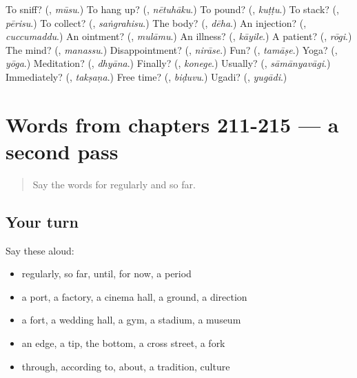 \begin{tcolorbox}[breakable,colback=teal!4,colframe=teal!35!black,title={Before you move on}]
To sniff? (\textbf{}, \emph{mūsu}.) To hang up? (\textbf{}, \emph{nētuhāku}.) To pound? (\textbf{}, \emph{kuṭṭu}.) To stack? (\textbf{}, \emph{pērisu}.) To collect? (\textbf{}, \emph{saṅgrahisu}.) The body? (\textbf{}, \emph{dēha}.) An injection? (\textbf{}, \emph{cuccumaddu}.) An ointment? (\textbf{}, \emph{mulāmu}.) An illness? (\textbf{}, \emph{kāyile}.) A patient? (\textbf{}, \emph{rōgi}.) The mind? (\textbf{}, \emph{manassu}.) Disappointment? (\textbf{}, \emph{nirāse}.) Fun? (\textbf{}, \emph{tamāṣe}.) Yoga? (\textbf{}, \emph{yōga}.) Meditation? (\textbf{}, \emph{dhyāna}.) Finally? (\textbf{}, \emph{konege}.) Usually? (\textbf{}, \emph{sāmānyavāgi}.) Immediately? (\textbf{}, \emph{takṣaṇa}.) Free time? (\textbf{}, \emph{biḍuvu}.) Ugadi? (\textbf{}, \emph{yugādi}.)
\end{tcolorbox}
\section[(dialogue)]{Words from chapters 211-215 — a second pass}

\label{lesson:KA-R215-second-pass-words-from-chapters-211-215}



\begin{quote}
Say the words for regularly and so far.
\end{quote}

\subsection*{Your turn}
Say these aloud:

\begin{itemize}
\raggedright
  \item regularly, so far, until, for now, a period
  \item a port, a factory, a cinema hall, a ground, a direction
  \item a fort, a wedding hall, a gym, a stadium, a museum
  \item an edge, a tip, the bottom, a cross street, a fork
  \item through, according to, about, a tradition, culture
\end{itemize}

